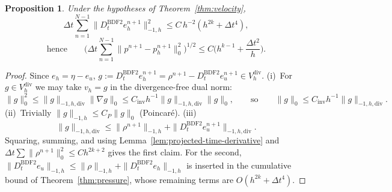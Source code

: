 \documentclass[11pt]{article}
\newtheorem{proposition}{Proposition}
\theoremstyle{remark}\newtheorem{remark}{Remark}
\newcommand{\Vdivh}{V_h^{\mathrm{div}}}
\newcommand{\Dt}{D_t^{\mathrm{BDF2}}}
\theoremstyle{plain}
\begin{document}
\begin{proposition}\label{prop:A1}
Under the hypotheses of Theorem~\ref{thm:velocity},
\[\Delta t\sum_{n=1}^{N-1}\|\Dt e_h^{n+1}\|_{-1,h}^2\le C\,h^{-2}(h^{2k}+\Delta t^4),\]\[\text{hence}\qquad\Big(\Delta t\sum_{n=1}^{N-1}\|p^{n+1}-p_h^{n+1}\|_0^2\Big)^{1/2}\le C\Big(h^{k-1}+\frac{\Delta t^2}{h}\Big).\]
\end{proposition}
\begin{proof}
Since $e_h=\eta-e_u$, $g:=\Dt e_h^{n+1}=\rho^{n+1}-\Dt e_u^{n+1}\in\Vdivh$. (i)~For $g\in\Vdivh$ we may take $v_h=g$ in the divergence-free dual norm:
\[
\|g\|_0^2\le\|g\|_{-1,h,\mathrm{div}}\|\nabla g\|_0\le C_{\mathrm{inv}}h^{-1}\|g\|_{-1,h,\mathrm{div}}\|g\|_0,
\qquad\text{so}\qquad
\|g\|_0\le C_{\mathrm{inv}}h^{-1}\|g\|_{-1,h,\mathrm{div}}.
\]
(ii)~Trivially $\|g\|_{-1,h}\le C_P\|g\|_0$ (Poincar\'e). (iii)
\[
\|g\|_{-1,h,\mathrm{div}}\le\|\rho^{n+1}\|_{-1,h}+\|\Dt e_u^{n+1}\|_{-1,h,\mathrm{div}}.
\]
Squaring, summing, and using Lemma~\ref{lem:projected-time-derivative} and $\Delta t\sum\|\rho^{n+1}\|_0^2\le Ch^{2k+2}$ gives the first claim. For the second, $\|\Dt e_u\|_{-1,h}\le\|\rho\|_{-1,h}+\|\Dt e_h\|_{-1,h}$ is inserted in the cumulative bound of Theorem~\ref{thm:pressure}, whose remaining terms are $O(h^{2k}+\Delta t^4)$.
\end{proof}
\end{document}
